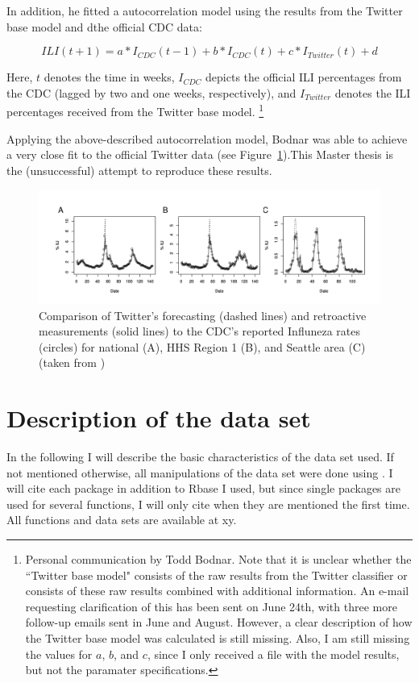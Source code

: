 \documentclass[11pt, a4paper]{report}\usepackage[]{graphicx}\usepackage[]{color}
\begin{document}
In addition, he fitted a autocorrelation model using the results from the Twitter base model and dthe official CDC data: 

$$ILI(t+1) = a*I_{CDC}(t-1) + b*I_{CDC}(t) + c*I_{Twitter}(t)+d$$

Here, $t$ denotes the time in weeks, $I_{CDC}$ depicts the official ILI percentages from the CDC (lagged by two and one weeks, respectively), and $I_{Twitter}$ denotes the ILI percentages received from the Twitter base model. \footnote{Personal communication by Todd Bodnar. Note that it is unclear whether the ``Twitter base model" consists of the raw results from the Twitter classifier or consists of these raw results combined with additional information. An e-mail requesting clarification of this has been sent on June 24th, with three more follow-up emails sent in June and August. However, a clear description of how the Twitter base model was calculated is still missing. Also, I am still missing the values for $a$, $b$, and $c$, since I only received a file with the model results, but not the paramater specifications.}\newline

Applying the above-described autocorrelation model, Bodnar was able to achieve a very close fit to the official Twitter data (see Figure~\ref{fig:cdc_fit_bodnar_thesis}).This Master thesis is the (unsuccessful) attempt to reproduce these results. 

\begin{figure}[h]
  \centering
    \includegraphics[width=.9\textwidth]{cdc_fit_bodnar_thesis.png}
  \caption{Comparison of Twitter's forecasting (dashed lines) and retroactive measurements (solid lines) to the CDC's reported Influneza rates (circles) for national (A), HHS Region 1 (B), and Seattle area (C) (taken from \citep{bodnar_data_2015})}
  \label{fig:cdc_fit_bodnar_thesis}
  \end{figure}

\chapter{Description of the data set}
\label{ch:data_set_description}
In the following I will describe the basic characteristics of the data set used. If not mentioned otherwise, all manipulations of the data set were done using . I will cite each package in addition to Rbase I used, but since single packages are used for several functions, I will only cite when they are mentioned the first time. All functions and data sets are available at xy.
\end{document}
